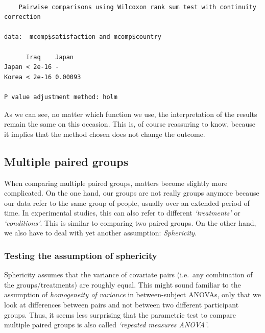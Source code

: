 \documentclass[
  letterpaper,
]{krantz}
\makeatletter
\newenvironment{Shaded}{\begin{snugshade}}{\end{snugshade}}
\newcommand{\AttributeTok}[1]{\textcolor[rgb]{0.40,0.45,0.13}{#1}}
\newcommand{\CommentTok}[1]{\textcolor[rgb]{0.37,0.37,0.37}{#1}}
\newcommand{\FunctionTok}[1]{\textcolor[rgb]{0.28,0.35,0.67}{#1}}
\newcommand{\NormalTok}[1]{\textcolor[rgb]{0.00,0.23,0.31}{#1}}
\newcommand{\SpecialCharTok}[1]{\textcolor[rgb]{0.37,0.37,0.37}{#1}}
\newcommand{\StringTok}[1]{\textcolor[rgb]{0.13,0.47,0.30}{#1}}
\newenvironment{kframe}{%
\medskip{}
\setlength{\fboxsep}{.8em}
 \def\at@end@of@kframe{}%
 \ifinner\ifhmode%
  \def\at@end@of@kframe{\end{minipage}}%
  \begin{minipage}{\columnwidth}%
 \fi\fi%
 \def\FrameCommand##1{\hskip\@totalleftmargin \hskip-\fboxsep
 \colorbox{shadecolor}{##1}\hskip-\fboxsep
     \hskip-\linewidth \hskip-\@totalleftmargin \hskip\columnwidth}%
 \MakeFramed {\advance\hsize-\width
   \@totalleftmargin\z@ \linewidth\hsize
   \@setminipage}}%
 {\par\unskip\endMakeFramed%
 \at@end@of@kframe}
\renewenvironment{Shaded}{\begin{kframe}}{\end{kframe}}
\makeatother
\begin{document}
\begin{Shaded}
\end{Shaded}

\begin{verbatim}

    Pairwise comparisons using Wilcoxon rank sum test with continuity correction 

data:  mcomp$satisfaction and mcomp$country 

      Iraq    Japan  
Japan < 2e-16 -      
Korea < 2e-16 0.00093

P value adjustment method: holm 
\end{verbatim}

As we can see, no matter which function we use, the interpretation of
the results remain the same on this occasion. This is, of course
reassuring to know, because it implies that the method chosen does not
change the outcome.

\subsection{Multiple paired groups}\label{sec-multiple-paired-groups}

When comparing multiple paired groups, matters become slightly more
complicated. On the one hand, our groups are not really groups anymore
because our data refer to the same group of people, usually over an
extended period of time. In experimental studies, this can also refer to
different \emph{`treatments'} or \emph{`conditions'}. This is similar to
comparing two paired groups. On the other hand, we also have to deal
with yet another assumption: \emph{Sphericity}.

\subsubsection{Testing the assumption of
sphericity}\label{sec-sphericity}

Sphericity assumes that the variance of covariate pairs (i.e.~any
combination of the groups/treatments) are roughly equal. This might
sound familiar to the assumption of \emph{homogeneity of variance} in
between-subject ANOVAs, only that we look at differences between pairs
and not between two different participant groups. Thus, it seems less
surprising that the parametric test to compare multiple paired groups is
also called \emph{`repeated measures ANOVA'}.
\end{document}
